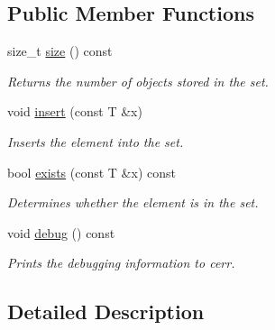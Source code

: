 \subsection*{Public Member Functions}
\begin{DoxyCompactItemize}
\item 
\hypertarget{class_std_hash_set_a663408a739a42a3f2b5e74e4097a354a}{size\-\_\-t \hyperlink{class_std_hash_set_a663408a739a42a3f2b5e74e4097a354a}{size} () const }\label{class_std_hash_set_a663408a739a42a3f2b5e74e4097a354a}

\begin{DoxyCompactList}\small\item\em Returns the number of objects stored in the set. \end{DoxyCompactList}\item 
\hypertarget{class_std_hash_set_a4e39ef224e2ee7d1c065c7f50e71aad5}{void \hyperlink{class_std_hash_set_a4e39ef224e2ee7d1c065c7f50e71aad5}{insert} (const T \&x)}\label{class_std_hash_set_a4e39ef224e2ee7d1c065c7f50e71aad5}

\begin{DoxyCompactList}\small\item\em Inserts the element into the set. \end{DoxyCompactList}\item 
\hypertarget{class_std_hash_set_a54040efb148792c1317ea6f892222a61}{bool \hyperlink{class_std_hash_set_a54040efb148792c1317ea6f892222a61}{exists} (const T \&x) const }\label{class_std_hash_set_a54040efb148792c1317ea6f892222a61}

\begin{DoxyCompactList}\small\item\em Determines whether the element is in the set. \end{DoxyCompactList}\item 
\hypertarget{class_std_hash_set_a23a35f0c0204e06b8dfa8becfab5fdfb}{void \hyperlink{class_std_hash_set_a23a35f0c0204e06b8dfa8becfab5fdfb}{debug} () const }\label{class_std_hash_set_a23a35f0c0204e06b8dfa8becfab5fdfb}

\begin{DoxyCompactList}\small\item\em Prints the debugging information to cerr. \end{DoxyCompactList}\end{DoxyCompactItemize}


\subsection{Detailed Description}

